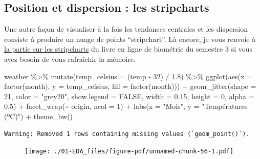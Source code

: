 \documentclass[
  a4paper,
  DIV=11,
  numbers=noendperiod,
  oneside]{scrreprt}
\newenvironment{Shaded}{}{}
\newcommand{\AttributeTok}[1]{\textcolor[rgb]{0.84,0.23,0.29}{#1}}
\newcommand{\ConstantTok}[1]{\textcolor[rgb]{0.00,0.36,0.77}{#1}}
\newcommand{\DecValTok}[1]{\textcolor[rgb]{0.00,0.36,0.77}{#1}}
\newcommand{\FloatTok}[1]{\textcolor[rgb]{0.00,0.36,0.77}{#1}}
\newcommand{\FunctionTok}[1]{\textcolor[rgb]{0.44,0.26,0.76}{#1}}
\newcommand{\NormalTok}[1]{\textcolor[rgb]{0.14,0.16,0.18}{#1}}
\newcommand{\SpecialCharTok}[1]{\textcolor[rgb]{0.00,0.36,0.77}{#1}}
\newcommand{\StringTok}[1]{\textcolor[rgb]{0.01,0.18,0.38}{#1}}
\begin{document}
\hypertarget{position-et-dispersion-les-stripcharts}{%
\subsection{Position et dispersion : les
stripcharts}\label{position-et-dispersion-les-stripcharts}}

Une autre façon de visualiser à la fois les tendances centrales et les
dispersion consiste à produire un nuage de points ``stripchart''. Là
encore, je vous renvoie à
\href{https://besibo.github.io/BiometrieS3/03-visualization.html\#les-stripcharts}{la
partie sur les stripcharts} du livre en ligne de biométrie du semestre 3
si vous avez besoin de vous rafraîchir la mémoire.

\begin{Shaded}
\begin{Highlighting}[]
\NormalTok{weather }\SpecialCharTok{\%\textgreater{}\%} 
  \FunctionTok{mutate}\NormalTok{(}\AttributeTok{temp\_celsius =}\NormalTok{ (temp }\SpecialCharTok{{-}} \DecValTok{32}\NormalTok{) }\SpecialCharTok{/} \FloatTok{1.8}\NormalTok{) }\SpecialCharTok{\%\textgreater{}\%} 
  \FunctionTok{ggplot}\NormalTok{(}\FunctionTok{aes}\NormalTok{(}\AttributeTok{x =} \FunctionTok{factor}\NormalTok{(month), }\AttributeTok{y =}\NormalTok{ temp\_celsius, }\AttributeTok{fill =} \FunctionTok{factor}\NormalTok{(month))) }\SpecialCharTok{+}
  \FunctionTok{geom\_jitter}\NormalTok{(}\AttributeTok{shape =} \DecValTok{21}\NormalTok{, }\AttributeTok{color =} \StringTok{"grey20"}\NormalTok{, }\AttributeTok{show.legend =} \ConstantTok{FALSE}\NormalTok{,}
              \AttributeTok{width =} \FloatTok{0.15}\NormalTok{, }\AttributeTok{height =} \DecValTok{0}\NormalTok{,}
              \AttributeTok{alpha =} \FloatTok{0.5}\NormalTok{) }\SpecialCharTok{+}
  \FunctionTok{facet\_wrap}\NormalTok{(}\SpecialCharTok{\textasciitilde{}}\NormalTok{ origin, }\AttributeTok{ncol =} \DecValTok{1}\NormalTok{) }\SpecialCharTok{+}
  \FunctionTok{labs}\NormalTok{(}\AttributeTok{x =} \StringTok{"Mois"}\NormalTok{, }\AttributeTok{y =} \StringTok{"Températures (ºC)"}\NormalTok{) }\SpecialCharTok{+}
  \FunctionTok{theme\_bw}\NormalTok{()}
\end{Highlighting}
\end{Shaded}

\begin{verbatim}
Warning: Removed 1 rows containing missing values (`geom_point()`).
\end{verbatim}

\begin{figure}[H]

{\centering \texttt{[image: ./01-EDA\_files/figure-pdf/unnamed-chunk-56-1.pdf]}

}

\end{figure}
\end{document}
